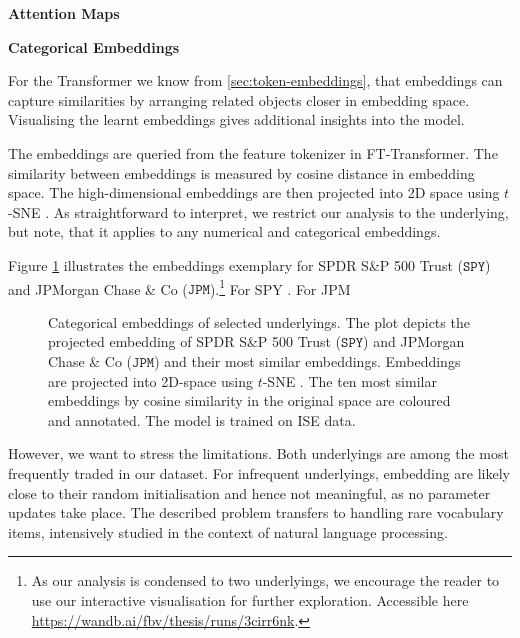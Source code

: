 \textbf{Attention Maps}

\textbf{Categorical Embeddings}

For the Transformer we know from \cref{sec:token-embeddings}, that embeddings can capture similarities by arranging related objects closer in embedding space. Visualising the learnt embeddings gives additional insights into the model.

The embeddings are queried from the feature tokenizer in FT-Transformer. The similarity between embeddings is measured by cosine distance in embedding space. The high-dimensional embeddings are then projected into 2D space using $t$-SNE \autocite{vandermaatenVisualizingDataUsing2008}. As straightforward to interpret, we restrict our analysis to the underlying, but note, that it applies to any numerical and categorical embeddings. 

Figure \cref{fig:categorical-embeddings} illustrates the embeddings exemplary for SPDR S\&P 500 Trust ($\mathtt{SPY}$) and JPMorgan Chase \& Co ($\mathtt{JPM}$).\footnote{As our analysis is condensed to two underlyings, we encourage the reader to use our interactive visualisation for further exploration. Accessible here \url{https://wandb.ai/fbv/thesis/runs/3cirr6nk}.} For SPY . For JPM 

\begin{figure}[!ht]
    \vfill
    \caption[Categorical Embeddings of Selected Underlyings]{Categorical embeddings of selected underlyings. The plot depicts the projected embedding of SPDR S\&P 500 Trust ($\mathtt{SPY}$) and JPMorgan Chase \& Co ($\mathtt{JPM}$) and their most similar embeddings. Embeddings are projected into 2D-space using $t$-SNE \autocite{vandermaatenVisualizingDataUsing2008}. The ten most similar embeddings by cosine similarity in the original space are coloured and annotated. The model is trained on \gls{ISE} data.}
    \label{fig:categorical-embeddings}
\end{figure}

However, we want to stress the limitations. Both underlyings are among the most frequently traded in our dataset. For infrequent underlyings, embedding are likely close to their random initialisation and hence not meaningful, as no parameter updates take place. The described problem transfers to handling rare vocabulary items, intensively studied in the context of natural language processing. 

